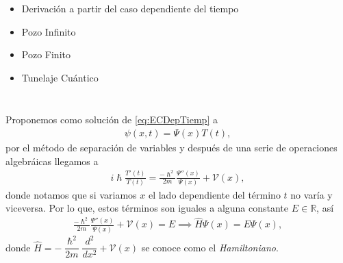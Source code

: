 \documentclass[aspectratio=1610]{beamer}
\newcommand*{\field}[1]{\mathbb{#1}}
\begin{document}
\begin{frame}
\frametitle{ }
\begin{columns}
\column{37em}
\begin{itemize}\itemsep1em
  \justifying
  \item  \textcolor{Ocean}{Derivación a partir del caso dependiente del tiempo} 
  \item  \textcolor{Ocean}{Pozo Infinito} 
  \item  \textcolor{Ocean}{Pozo Finito} 
  \item  \textcolor{Ocean}{Tunelaje Cuántico}
\end{itemize}
\end{columns}
\end{frame}





\bgroup
\begin{frame}{}
Proponemos como solución de \eqref{eq:ECDepTiemp} a
\begin{align*}
    \psi(x,t) = \Psi(x)T(t),
\end{align*}
por el método de separación de variables y después de una serie de operaciones algebráicas llegamos a 
\begin{align*}
    i\hslash \frac{T'(t) }{T(t)} = \frac{-\hslash ^2 }{2m}\frac{\Psi''(x)}{\Psi(x)} + \mathcal{V}(x),
\end{align*}
donde notamos que si variamos $x$ el lado dependiente del término $t$ no varía y viceversa. Por lo que, estos términos son iguales a alguna constante $E \in \field{R}$, así
\begin{align}
\frac{-\hslash ^2 }{2m}\frac{\Psi''(x)}{\Psi(x)} + \mathcal{V}(x) = E \implies 
\hat{H} \Psi(x) = E \Psi(x),
\label{eq:HamiltonianEigenValues}
\end{align}
donde $\hat{H} = - \dfrac{\hslash^2}{2m}\dfrac{d^2}{dx^2} + \mathcal{V}(x)$ se conoce como el  \textit{Hamiltoniano}.

\end{frame}
\end{document}
